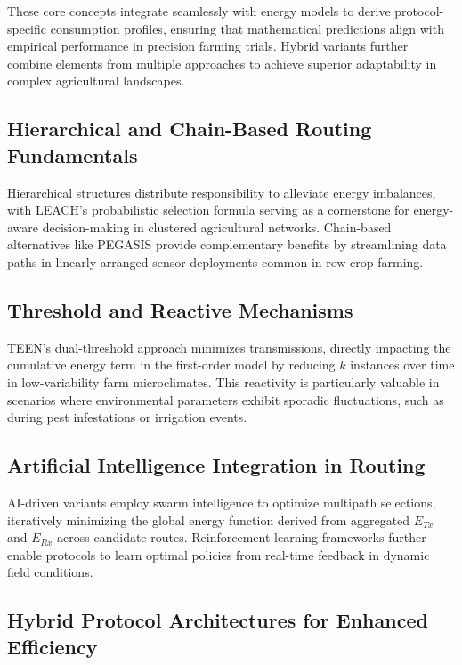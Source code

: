 \documentclass[12pt]{article}
\begin{document}
These core concepts integrate seamlessly with energy models to derive protocol-specific consumption profiles, ensuring that mathematical predictions align with empirical performance in precision farming trials. Hybrid variants further combine elements from multiple approaches to achieve superior adaptability in complex agricultural landscapes.

\subsection{Hierarchical and Chain-Based Routing Fundamentals}

Hierarchical structures distribute responsibility to alleviate energy imbalances, with LEACH's probabilistic selection formula serving as a cornerstone for energy-aware decision-making in clustered agricultural networks. Chain-based alternatives like PEGASIS provide complementary benefits by streamlining data paths in linearly arranged sensor deployments common in row-crop farming.

\subsection{Threshold and Reactive Mechanisms}

TEEN's dual-threshold approach minimizes transmissions, directly impacting the cumulative energy term in the first-order model by reducing \( k \) instances over time in low-variability farm microclimates. This reactivity is particularly valuable in scenarios where environmental parameters exhibit sporadic fluctuations, such as during pest infestations or irrigation events.

\subsection{Artificial Intelligence Integration in Routing}

AI-driven variants employ swarm intelligence to optimize multipath selections, iteratively minimizing the global energy function derived from aggregated \( E_{Tx} \) and \( E_{Rx} \) across candidate routes. Reinforcement learning frameworks further enable protocols to learn optimal policies from real-time feedback in dynamic field conditions.

\subsection{Hybrid Protocol Architectures for Enhanced Efficiency}
\end{document}
